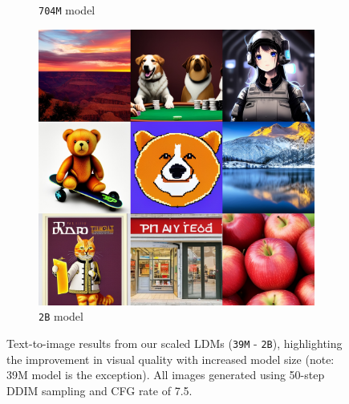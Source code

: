 \begin{figure}[htbp]
\begin{subfigure}[b]{0.32\textwidth}
    \caption{\texttt{704M} model}
    \end{subfigure}
    \begin{subfigure}[b]{0.32\textwidth}
    \centering
    \includegraphics[width=\textwidth]{cp2/figures/t2i/c512.jpg}
    \caption{\texttt{2B} model}
    \end{subfigure}

\caption{
Text-to-image results from our scaled LDMs (\texttt{39M} - \texttt{2B}), highlighting the improvement in visual quality with increased model size (note: 39M model is the exception). All images generated using 50-step DDIM sampling and CFG rate of 7.5.
%
%
}
\label{fig:t2i_results}
\end{figure}


